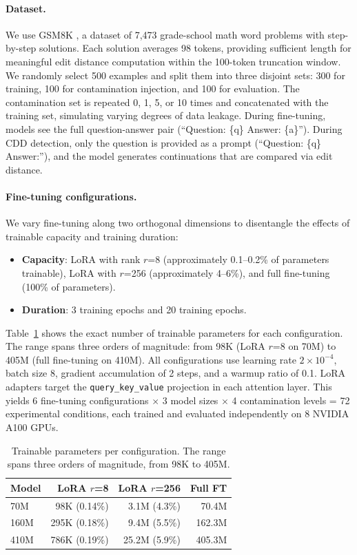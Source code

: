 \documentclass[11pt]{article}
\begin{document}
\paragraph{Dataset.} We use GSM8K \citep{cobbe2021training}, a dataset of 7,473 grade-school math word problems with step-by-step solutions. Each solution averages 98 tokens, providing sufficient length for meaningful edit distance computation within the 100-token truncation window. We randomly select 500 examples and split them into three disjoint sets: 300 for training, 100 for contamination injection, and 100 for evaluation. The contamination set is repeated 0, 1, 5, or 10 times and concatenated with the training set, simulating varying degrees of data leakage. During fine-tuning, models see the full question-answer pair (``Question: \{q\} Answer: \{a\}''). During CDD detection, only the question is provided as a prompt (``Question: \{q\} Answer:''), and the model generates continuations that are compared via edit distance.

\paragraph{Fine-tuning configurations.} We vary fine-tuning along two orthogonal dimensions to disentangle the effects of trainable capacity and training duration:
\begin{itemize}
    \item \textbf{Capacity}: LoRA \citep{hu2022lora} with rank $r$=8 (approximately 0.1--0.2\% of parameters trainable), LoRA with $r$=256 (approximately 4--6\%), and full fine-tuning (100\% of parameters).
    \item \textbf{Duration}: 3 training epochs and 20 training epochs.
\end{itemize}
Table~\ref{tab:params} shows the exact number of trainable parameters for each configuration. The range spans three orders of magnitude: from 98K (LoRA $r$=8 on 70M) to 405M (full fine-tuning on 410M). All configurations use learning rate $2 \times 10^{-4}$, batch size 8, gradient accumulation of 2 steps, and a warmup ratio of 0.1. LoRA adapters target the \texttt{query\_key\_value} projection in each attention layer. This yields 6 fine-tuning configurations $\times$ 3 model sizes $\times$ 4 contamination levels = 72 experimental conditions, each trained and evaluated independently on 8 NVIDIA A100 GPUs.

\begin{table}[t]
\centering
\small
\begin{tabular}{lrrr}
\toprule
\textbf{Model} & \textbf{LoRA $r$=8} & \textbf{LoRA $r$=256} & \textbf{Full FT} \\
\midrule
70M   & 98K (0.14\%)  & 3.1M (4.3\%)  & 70.4M \\
160M  & 295K (0.18\%) & 9.4M (5.5\%)  & 162.3M \\
410M  & 786K (0.19\%) & 25.2M (5.9\%) & 405.3M \\
\bottomrule
\end{tabular}
\caption{Trainable parameters per configuration. The range spans three orders of magnitude, from 98K to 405M.}
\label{tab:params}
\end{table}
\end{document}

